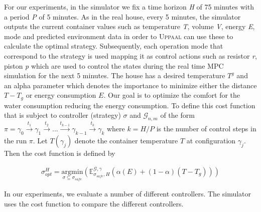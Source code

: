         For our experiments, in the simulator we fix a time horizon \emph{H} of 75 minutes
        with a period \emph{P} of 5 minutes. As in the real house, every 
        5 minutes, the simulator outputs the current container values such as
        temperature \emph{T}, volume \emph{V}, energy \emph{E}, mode and predicted 
        environment data in order to \textsc{Uppaal} can use these to calculate the optimal
        strategy. Subsequently, each operation mode that correspond to the strategy
        is used mapping it as control actions such as resistor \emph{r}, 
        piston \emph{p} which are used to control the states during the 
        real time \ac{MPC} simulation for the next 5 minutes. The house 
        has a desired temperature $T^g$ and an alpha parameter which denotes 
        the importance to minimize either the distance $T - T_g$ or energy 
        consumption $E$. Our goal is to optimize  
        the comfort for the water consumption reducing the energy consumption. 
        To define this cost function that is subject to controller (strategy) $\sigma$ and 
        $\mathcal{G}_{n,m}$ of the form $\pi = \gamma_0 \xrightarrow{t_{1}} 
        \gamma_1 \xrightarrow{t_{2}} ... \xrightarrow{t_{k-1}} 
        \gamma_{k-1} \xrightarrow{t_{k}} \gamma_{k}$ where $k = H/P$ is the 
        number of control steps in the run $\pi$. Let $T(\gamma_j)$ denote
        the container temperature $T$ at configuration $\gamma_j$. Then the 
        cost function is defined by

        \begin{equation}
          \begin{aligned}
            \sigma^{H}_{opt} = \underset{\sigma \subseteq \sigma_{safe}}{\mathrm{argmin}}(\mathbb{E}^{\mathcal{G},\gamma}_{\sigma_{safe},H}(\alpha(E) + (1-\alpha)(T-T_g)))
          \end{aligned}
          \label{eq:costfunction}
        \end{equation}

        In our experiments, we evaluate a number of different controllers. The 
        simulator uses the cost function to compare the different
        controllers.

        \clearpage

